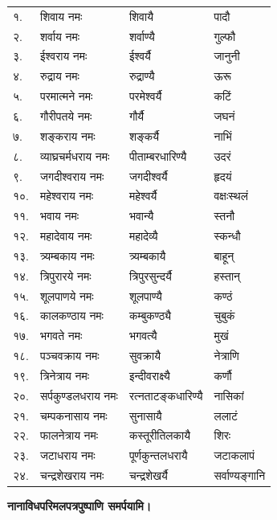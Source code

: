 \begin{longtable}{ll@{~---~}l@{~नमः}l@{~पूजयामि}}
    १. & शिवाय नमः & शिवायै & पादौ\\
    २. & शर्वाय नमः & शर्वाण्यै & गुल्फौ\\
    ३. & ईश्वराय नमः & ईश्वर्यै & जानुनी\\
    ४. & रुद्राय नमः & रुद्राण्यै & ऊरू\\
    ५. & परमात्मने नमः & परमेश्वर्यै & कटिं\\
    ६. & गौरीपतये नमः & गौर्यै & जघनं\\
    ७. & शङ्कराय नमः & शङ्कर्यै & नाभिं\\
    ८. & व्याघ्रचर्मधराय नमः & पीताम्बरधारिण्यै & उदरं\\
    ९. & जगदीश्वराय नमः & जगदीश्वर्यै & हृदयं\\
    १०. & महेश्वराय नमः & महेश्वर्यै & वक्षःस्थलं\\
    ११. & भवाय नमः & भवान्यै & स्तनौ\\
    १२. & महादेवाय नमः & महादेव्यै & स्कन्धौ\\
    १३. & त्र्यम्बकाय नमः & त्र्यम्बकायै & बाहून्\\
    १४. & त्रिपुरारये नमः & त्रिपुरसुन्दर्यै & हस्तान्\\
    १५. & शूलपाणये नमः & शूलपाण्यै & कण्ठं\\
    १६. & कालकण्ठाय नमः & कम्बुकण्ठ्यै & चुबुकं\\
    १७. & भगवते नमः & भगवत्यै & मुखं\\
    १८. & पञ्चवक्राय नमः & सुवक्रायै & नेत्राणि\\
    १९. & त्रिनेत्राय नमः & इन्दीवराक्ष्यै & कर्णौ\\
    २०. & सर्पकुण्डलधराय नमः & रत्नताटङ्कधारिण्यै & नासिकां\\
    २१. & चम्पकनासाय नमः & सुनासायै & ललाटं\\
    २२. & फालनेत्राय नमः & कस्तूरीतिलकायै & शिरः\\
    २३. & जटाधराय नमः & पूर्णकुन्तलधरायै & जटाकलापं\\
    २४. & चन्द्रशेखराय नमः & चन्द्रशेखर्यै & सर्वाण्यङ्गानि\\
\end{longtable}

\needspace{3em}
\begingroup
\setlength{\columnseprule}{1pt}
\let\chapt\sect


\endgroup

\textbf{\devAya{} नानाविध\-परिमल\-पत्रपुष्पाणि समर्पयामि।}

